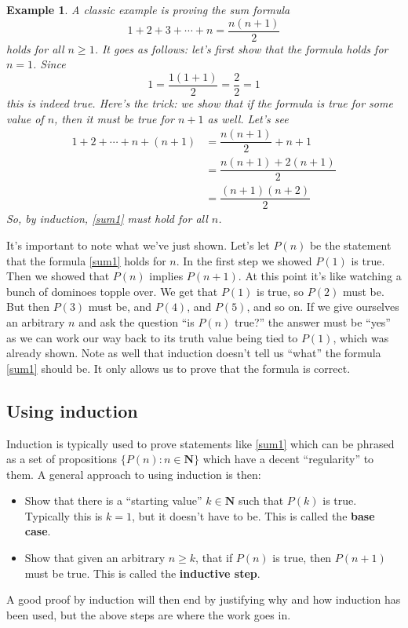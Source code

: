 \documentclass[12pt]{article}
\numberwithin{equation}{subsection}
\theoremstyle{note}
\newtheorem{example}[subsection]{Example}
\begin{document}
\begin{example} A classic example is proving the sum formula \begin{equation} 1+2+3+\cdots+n=\dfrac{n(n+1)}{2} \label{sum1} \end{equation} holds for all $n\geq 1$. It goes as follows: let's first show that the formula holds for $n=1$. Since \[ 1 = \dfrac{1(1+1)}{2}=\dfrac{2}{2}=1\] this is indeed true. Here's the trick: we show that \textit{if} the formula is true for some value of $n$, then it \textit{must} be true for $n+1$ as well. Let's see \begin{align*}
1+2+\cdots+n+(n+1) &= \dfrac{n(n+1)}{2}+n+1\\ &= \dfrac{ n(n+1)+2(n+1)}{2}\\&= \dfrac{(n+1)(n+2)}{2}\end{align*}
So, by induction, \eqref{sum1} must hold for all $n$.
\end{example}

It's important to note what we've just shown. Let's let $P(n)$ be the statement that the formula \eqref{sum1} holds for $n$. In the first step we showed $P(1)$ is true. Then we showed that $P(n)$ implies $P(n+1)$. At this point it's like watching a bunch of dominoes topple over. We get that $P(1)$ is true, so $P(2)$ must be. But then $P(3)$ must be, and $P(4)$, and $P(5)$,  and so on. If we give ourselves an arbitrary $n$ and ask the question ``is $P(n)$ true?'' the answer must be ``yes'' as we can work our way back to its truth value being tied to $P(1)$, which was already shown. Note as well that induction doesn't tell us ``what'' the formula \eqref{sum1} should be. It only allows us to prove that the formula is correct. 


\subsection{Using induction}

Induction is typically used to prove statements like \eqref{sum1} which can be phrased as a set of propositions $\{P(n) : n\in \mathbf{N}\}$ which have a decent ``regularity'' to them. A general approach to using induction is then:
\begin{itemize}
	\item Show that there is a ``starting value'' $k\in\mathbf{N}$ such that $P(k)$ is true. Typically this is $k=1$, but it doesn't have to be. This is called the \textbf{base case}.
	\item Show that given an arbitrary $n\geq k$, that if $P(n)$ is true, then $P(n+1)$ must be true. This is called the \textbf{inductive step}.
\end{itemize}
A good proof by induction will then end by justifying why and how induction has been used, but the above steps are where the work goes in. 
\end{document}
